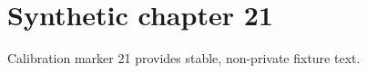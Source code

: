 \chapter{Synthetic chapter 21}\label{chap:21}
Calibration marker 21 provides stable, non-private fixture text.

